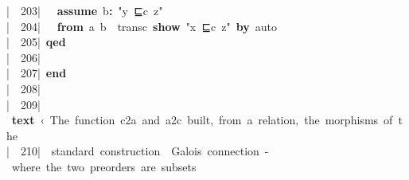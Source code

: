 \documentclass{article}
\newcommand{\syntaxCOMMENTC}[1]{\textcolor[rgb]{0.4,0.0,0.8}{#1}}
\newcommand{\syntaxKEYWORDA}[1]{\textcolor[rgb]{0.0,0.4,0.6}{\textbf{#1}}}
\newcommand{\syntaxKEYWORDB}[1]{\textcolor[rgb]{0.0,0.6,0.4}{\textbf{#1}}}
\newcommand{\syntaxKEYWORDC}[1]{\textcolor[rgb]{0.0,0.6,1.0}{\textbf{#1}}}
\newcommand{\syntaxLITERALA}[1]{\textcolor[rgb]{1.0,0.0,0.8}{#1}}
\newcommand{\syntaxOPERATOR}[1]{\textcolor[rgb]{0.0,0.0,0.0}{\textbf{#1}}}
\newcommand{\syntaxCOMMENTC}[1]{\textcolor[rgb]{0.4,0.0,0.8}{#1}}
\newcommand{\syntaxKEYWORDA}[1]{\textcolor[rgb]{0.0,0.4,0.6}{\textbf{#1}}}
\newcommand{\syntaxKEYWORDB}[1]{\textcolor[rgb]{0.0,0.6,0.4}{\textbf{#1}}}
\newcommand{\syntaxKEYWORDC}[1]{\textcolor[rgb]{0.0,0.6,1.0}{\textbf{#1}}}
\newcommand{\syntaxLITERALA}[1]{\textcolor[rgb]{1.0,0.0,0.8}{#1}}
\newcommand{\syntaxOPERATOR}[1]{\textcolor[rgb]{0.0,0.0,0.0}{\textbf{#1}}}
\newcommand{\syntaxCOMMENTC}[1]{\textcolor[rgb]{0.4,0.0,0.8}{#1}}
\newcommand{\syntaxKEYWORDA}[1]{\textcolor[rgb]{0.0,0.4,0.6}{\textbf{#1}}}
\newcommand{\syntaxKEYWORDB}[1]{\textcolor[rgb]{0.0,0.6,0.4}{\textbf{#1}}}
\newcommand{\syntaxKEYWORDC}[1]{\textcolor[rgb]{0.0,0.6,1.0}{\textbf{#1}}}
\newcommand{\syntaxLITERALA}[1]{\textcolor[rgb]{1.0,0.0,0.8}{#1}}
\newcommand{\syntaxOPERATOR}[1]{\textcolor[rgb]{0.0,0.0,0.0}{\textbf{#1}}}
\newcommand{\syntaxCOMMENTC}[1]{\textcolor[rgb]{0.4,0.0,0.8}{\textbf{#1}}}
\newcommand{\syntaxKEYWORDA}[1]{\textcolor[rgb]{0.0,0.4,0.6}{#1}}
\newcommand{\syntaxKEYWORDB}[1]{\textcolor[rgb]{0.0,0.6,0.4}{#1}}
\newcommand{\syntaxKEYWORDC}[1]{\textcolor[rgb]{0.0,0.6,1.0}{#1}}
\newcommand{\syntaxLITERALA}[1]{\textcolor[rgb]{1.0,0.0,0.8}{\textbf{#1}}}
\newcommand{\syntaxOPERATOR}[1]{\textcolor[rgb]{0.0,0.0,0.0}{#1}}
\newcommand{\syntaxCOMMENTC}[1]{\textcolor[rgb]{0.4,0.0,0.8}{#1}}
\newcommand{\syntaxKEYWORDA}[1]{\textcolor[rgb]{0.0,0.4,0.6}{\textbf{#1}}}
\newcommand{\syntaxKEYWORDB}[1]{\textcolor[rgb]{0.0,0.6,0.4}{\textbf{#1}}}
\newcommand{\syntaxKEYWORDC}[1]{\textcolor[rgb]{0.0,0.6,1.0}{\textbf{#1}}}
\newcommand{\syntaxLITERALA}[1]{\textcolor[rgb]{1.0,0.0,0.8}{#1}}
\newcommand{\syntaxOPERATOR}[1]{\textcolor[rgb]{0.0,0.0,0.0}{\textbf{#1}}}
\newcommand{\syntaxCOMMENTC}[1]{\textcolor[rgb]{0.4,0.0,0.8}{#1}}
\newcommand{\syntaxKEYWORDA}[1]{\textcolor[rgb]{0.0,0.4,0.6}{\textbf{#1}}}
\newcommand{\syntaxKEYWORDB}[1]{\textcolor[rgb]{0.0,0.6,0.4}{\textbf{#1}}}
\newcommand{\syntaxKEYWORDC}[1]{\textcolor[rgb]{0.0,0.6,1.0}{\textbf{#1}}}
\newcommand{\syntaxLITERALA}[1]{\textcolor[rgb]{1.0,0.0,0.8}{#1}}
\newcommand{\syntaxOPERATOR}[1]{\textcolor[rgb]{0.0,0.0,0.0}{\textbf{#1}}}
\newcommand{\syntaxCOMMENTC}[1]{\textcolor[rgb]{0.0,0.0,0.0}{#1}}
\newcommand{\syntaxKEYWORDA}[1]{\textcolor[rgb]{0.0,0.0,0.0}{#1}}
\newcommand{\syntaxKEYWORDB}[1]{\textcolor[rgb]{0.0,0.0,0.0}{#1}}
\newcommand{\syntaxKEYWORDC}[1]{\textcolor[rgb]{0.0,0.0,0.0}{#1}}
\newcommand{\gutter}[1]{\textcolor[rgb]{0,0,0}{{|}#1}}
\newcommand{\gutterH}[1]{\textcolor[rgb]{1,0,0}{{|}#1}}
\begin{document}
\gutter{\ \ 203{|}\ }{\ }{\ }\syntaxKEYWORDC{assume}{\ }b\syntaxOPERATOR{:}{\ }\syntaxLITERALA{"y{\ }⊑c{\ }z"}\hspace*{\fill}\\
\gutter{\ \ 204{|}\ }{\ }{\ }\syntaxKEYWORDA{from}{\ }a{\ }b{\ }{\ }transc{\ }\syntaxKEYWORDC{show}{\ }\syntaxLITERALA{"x{\ }⊑c{\ }z"}{\ }\syntaxKEYWORDA{by}{\ }auto{\ }\hspace*{\fill}\\
\gutterH{\ \ 205{|}\ }\syntaxKEYWORDA{qed}{\ }\hspace*{\fill}\\
\gutter{\ \ 206{|}\ }\hspace*{\fill}\\
\gutter{\ \ 207{|}\ }\syntaxKEYWORDB{end}\hspace*{\fill}\\
\gutter{\ \ 208{|}\ }\hspace*{\fill}\\
\gutter{\ \ 209{|}\ }\syntaxKEYWORDA{text}{\ }\syntaxCOMMENTC{‹}\syntaxCOMMENTC{{\ }}\syntaxCOMMENTC{T}\syntaxCOMMENTC{h}\syntaxCOMMENTC{e}\syntaxCOMMENTC{{\ }}\syntaxCOMMENTC{f}\syntaxCOMMENTC{u}\syntaxCOMMENTC{n}\syntaxCOMMENTC{c}\syntaxCOMMENTC{t}\syntaxCOMMENTC{i}\syntaxCOMMENTC{o}\syntaxCOMMENTC{n}\syntaxCOMMENTC{{\ }}\syntaxCOMMENTC{c}\syntaxCOMMENTC{2}\syntaxCOMMENTC{a}\syntaxCOMMENTC{{\ }}\syntaxCOMMENTC{a}\syntaxCOMMENTC{n}\syntaxCOMMENTC{d}\syntaxCOMMENTC{{\ }}\syntaxCOMMENTC{a}\syntaxCOMMENTC{2}\syntaxCOMMENTC{c}\syntaxCOMMENTC{{\ }}\syntaxCOMMENTC{b}\syntaxCOMMENTC{u}\syntaxCOMMENTC{i}\syntaxCOMMENTC{l}\syntaxCOMMENTC{t}\syntaxCOMMENTC{,}\syntaxCOMMENTC{{\ }}\syntaxCOMMENTC{f}\syntaxCOMMENTC{r}\syntaxCOMMENTC{o}\syntaxCOMMENTC{m}\syntaxCOMMENTC{{\ }}\syntaxCOMMENTC{a}\syntaxCOMMENTC{{\ }}\syntaxCOMMENTC{r}\syntaxCOMMENTC{e}\syntaxCOMMENTC{l}\syntaxCOMMENTC{a}\syntaxCOMMENTC{t}\syntaxCOMMENTC{i}\syntaxCOMMENTC{o}\syntaxCOMMENTC{n}\syntaxCOMMENTC{,}\syntaxCOMMENTC{{\ }}\syntaxCOMMENTC{t}\syntaxCOMMENTC{h}\syntaxCOMMENTC{e}\syntaxCOMMENTC{{\ }}\syntaxCOMMENTC{m}\syntaxCOMMENTC{o}\syntaxCOMMENTC{r}\syntaxCOMMENTC{p}\syntaxCOMMENTC{h}\syntaxCOMMENTC{i}\syntaxCOMMENTC{s}\syntaxCOMMENTC{m}\syntaxCOMMENTC{s}\syntaxCOMMENTC{{\ }}\syntaxCOMMENTC{o}\syntaxCOMMENTC{f}\syntaxCOMMENTC{{\ }}\syntaxCOMMENTC{t}\syntaxCOMMENTC{h}\syntaxCOMMENTC{e}\hspace*{\fill}\\
\gutterH{\ \ 210{|}\ }\syntaxCOMMENTC{{\ }standard{\ }construction{\ }{\ }Galois{\ }connection{\ }{-}{\ }where{\ }the{\ }two{\ }preorders{\ }are{\ }subsets{\ }}\hspace*{\fill}\\
\end{document}
